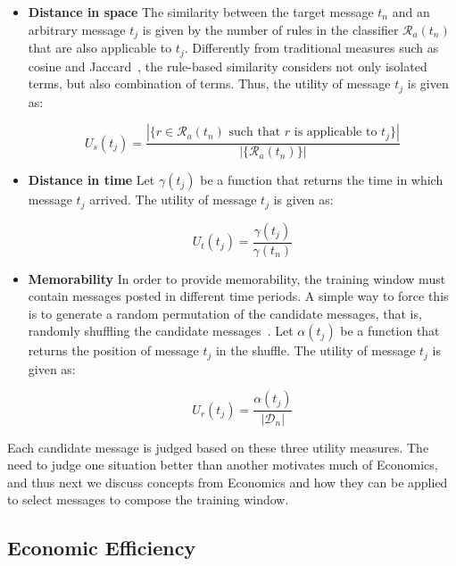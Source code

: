 \begin{itemize}
\item{\bf{Distance in space}}
The similarity between the target message $t_n$ and an arbitrary message $t_j$ is given by the number of rules in the classifier $\mathcal{R}_a(t_n)$ that are also applicable to $t_j$.
Differently from traditional measures such as cosine and Jaccard~\cite{baeza99modern}, the rule-based similarity considers not only isolated terms, but also combination of terms.
Thus, the utility of message $t_j$ is given as:

\begin{equation}
U_s(t_j)=\displaystyle\frac{|\{r\in\mathcal{R}_a(t_n)\mbox{ such that }r\mbox{ is applicable to }t_j\}|}{|\{\mathcal{R}_a(t_n)\}|}
\end{equation}

\item{\bf{Distance in time}}
Let $\gamma(t_j)$ be a function that returns the time in which message $t_j$ arrived. The utility of message $t_j$ is given as: 

\begin{equation}
U_t(t_j)=\displaystyle\frac{\gamma(t_j)}{\gamma(t_n)}
\end{equation}

\item{\bf{Memorability}}
In order to provide memorability, the training window must contain messages posted in different time periods. A simple way to force this is to generate a random permutation of the candidate messages, that is, randomly shuffling the candidate messages~\cite{permutation}.
Let $\alpha(t_j)$ be a function that returns the position of message $t_j$ in the shuffle.
The utility of message $t_j$ is given as:

\begin{equation}
U_r(t_j)=\frac{\alpha(t_j)}{|\mathcal{D}_n|}
\end{equation}

\end{itemize}

Each candidate message is judged based on these three utility measures. The need to judge one situation better than another motivates much of Economics, and thus next we discuss concepts from Economics and how they can be applied to select messages to compose the training window.

\subsection{Economic Efficiency}

